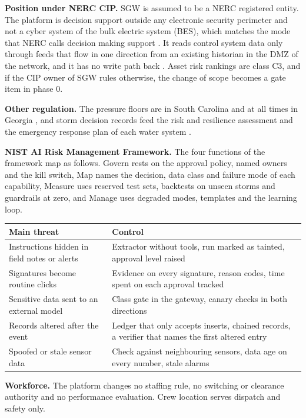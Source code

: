 \documentclass[fontsize=10pt,a4paper,DIV=12,parskip=half-,numbers=noenddot,headsepline,captions=tableheading]{scrartcl}
\begin{document}
\textbf{Position under NERC CIP.} SGW is assumed to be a NERC registered entity. The platform is decision support outside any electronic security perimeter and not a cyber system of the bulk electric system (BES), which matches the mode that NERC calls decision making support \citep{nerc_aiml_2024}. It reads control system data only through feeds that flow in one direction from an existing historian in the DMZ of the network, and it has no write path back \citep{nerc_cip}. Asset risk rankings are class C3, and if the CIP owner of SGW rules otherwise, the change of scope becomes a gate item in phase 0.

\textbf{Other regulation.} The pressure floors are  in South Carolina \citep{sc_r61_58} and  at all times in Georgia \citep{ga_391_3_5_10}, and storm decision records feed the risk and resilience assessment and the emergency response plan of each water system \citep{epa_awia_2013}.

\textbf{NIST AI Risk Management Framework.} The four functions of the framework \citep{nist2023airmf} map as follows. Govern rests on the approval policy, named owners and the kill switch, Map names the decision, data class and failure mode of each capability, Measure uses reserved test sets, backtests on unseen storms and guardrails at zero, and Manage uses degraded modes, templates and the learning loop.

{\footnotesize\par\noindent
\begin{tabularx}{\textwidth}{@{}L{4.4cm} Y@{}}
  \toprule
  \textbf{Main threat} & \textbf{Control} \\ \midrule
  Instructions hidden in field notes or alerts & Extractor without tools, run marked as tainted, approval level raised \\ \lightrowrule
  Signatures become routine clicks & Evidence on every signature, reason codes, time spent on each approval tracked \\ \lightrowrule
  Sensitive data sent to an external model & Class gate in the gateway, canary checks in both directions \\ \lightrowrule
  Records altered after the event & Ledger that only accepts inserts, chained records, a verifier that names the first altered entry \\ \lightrowrule
  Spoofed or stale sensor data & Check against neighbouring sensors, data age on every number, stale alarms \\ \bottomrule
\end{tabularx}}\par
\textbf{Workforce.} The platform changes no staffing rule, no switching or clearance authority and no performance evaluation. Crew location serves dispatch and safety only.
\end{document}
